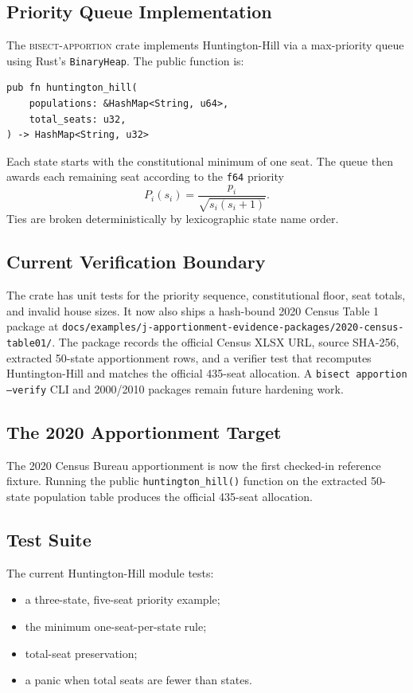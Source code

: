 \label{sec:implementation}

\subsection{Priority Queue Implementation}

The \textsc{bisect-apportion} crate implements Huntington-Hill via
a max-priority queue using Rust's \texttt{BinaryHeap}.
The public function is:

\begin{verbatim}
pub fn huntington_hill(
    populations: &HashMap<String, u64>,
    total_seats: u32,
) -> HashMap<String, u32>
\end{verbatim}

Each state starts with the constitutional minimum of one seat.  The queue then
awards each remaining seat according to the \texttt{f64} priority
\[
  P_i(s_i) = \frac{p_i}{\sqrt{s_i(s_i+1)}}.
\]
Ties are broken deterministically by lexicographic state name order.

\subsection{Current Verification Boundary}

The crate has unit tests for the priority sequence, constitutional floor, seat
totals, and invalid house sizes.  It now also ships a hash-bound 2020 Census
Table 1 package at
\texttt{docs/examples/j-apportionment-evidence-packages/2020-census-table01/}.
The package records the official Census XLSX URL, source SHA-256, extracted
50-state apportionment rows, and a verifier test that recomputes
Huntington-Hill and matches the official 435-seat allocation.  A
\texttt{bisect apportion --verify} CLI and 2000/2010 packages remain future
hardening work.

\subsection{The 2020 Apportionment Target}

The 2020 Census Bureau apportionment is now the first checked-in reference
fixture.  Running the public \texttt{huntington\_hill()} function on the
extracted 50-state population table produces the official 435-seat allocation.

\subsection{Test Suite}

The current Huntington-Hill module tests:
\begin{itemize}
  \item a three-state, five-seat priority example;
  \item the minimum one-seat-per-state rule;
  \item total-seat preservation;
  \item a panic when total seats are fewer than states.
\end{itemize}
